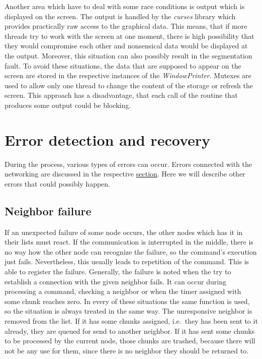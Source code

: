Another area which have to deal with some race conditions is output
which is displayed on the screen. The output is handled by the
\textit{curses} library which provides practically raw access to the
graphical data. This means, that if more threads try to work with the
screen at one moment, there is high possibility that they would
compromise each other and nonsensical data would be displayed at the
output. Moreover, this situation can also possibly result in the
segmentation fault. To avoid these situations, the data that are
supposed to appear on the screen are stored in the respective instances
of the \textit{WindowPrinter}. Mutexes are used to allow only one thread
to change the content of the storage or refresh the screen. This
approach has a disadvantage, that each call of the routine that produces
some output could be blocking.

\section{Error detection and
recovery}\label{error-detection-and-recovery}

During the process, various types of errors can occur. Errors connected
with the networking are discussed in the respective
\hyperref[handling-errors]{section}. Here we will describe other errors
that could possibly happen.

\subsection*{Neighbor failure}

If an unexpected failure of some node occurs, the other nodes which has
it in their lists must react. If the communication is interrupted in the
middle, there is no way how the other node can recognize the failure, so
the command's execution just fails. Nevertheless, this usually leads to
repetition of the command. This is able to register the failure.
Generally, the failure is noted when the try to establish a connection
with the given neighbor fails. It can occur during processing a command,
checking a neighbor or when the timer assigned with some chunk reaches
zero. In every of these situations the same function is used, so the
situation is always treated in the same way. The unresponsive neighbor
is removed from the list. If it has some chunks assigned, i.e.~they has
been sent to it already, they are queued for send to another neighbor.
If it has sent some chunks to be processed by the current node, those
chunks are trashed, because there will not be any use for them, since
there is no neighbor they should be returned to.

